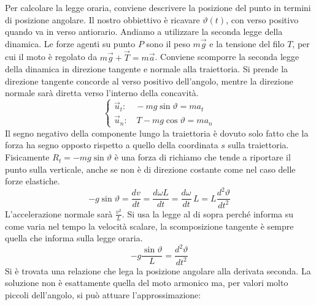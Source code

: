 \documentclass[10pt,a4paper]{book}
\begin{document}
\begin{figure}[htpb]
\end{figure}

Per calcolare la legge oraria, conviene descrivere la posizione del punto in termini di posizione angolare. Il nostro obbiettivo è ricavare $\vartheta (t)$, con verso positivo quando va in verso antiorario. Andiamo a utilizzare la seconda legge della dinamica. Le forze agenti su punto $P$ sono il peso $m\vec{g}$ e la tensione del filo $T$, per cui il moto è regolato da $m\vec{g}+\vec{T}=m\vec{a}$. Conviene scomporre la seconda legge della dinamica in direzione tangente e normale alla traiettoria. Si prende la direzione tangente concorde al verso positivo dell'angolo, mentre la direzione normale sarà diretta verso l'interno della concavità.
\[
	\begin{cases} \vec{u}_t: \quad -mg\sin\vartheta=ma_t \\ \vec{u}_n: \quad T-mg\cos\vartheta=ma_n \end{cases}
\]
Il segno negativo della componente lungo la traiettoria è dovuto solo fatto che la forza ha segno opposto rispetto a quello della coordinata $s$ sulla traiettoria. Fisicamente $R_t=-mg\sin\vartheta$ è una forza di richiamo che tende a riportare il punto sulla verticale, anche se non è di direzione costante come nel caso delle forze elastiche.
\[
	-g\sin\vartheta=\frac{dv}{dt}=\frac{d\omega L}{dt}=\frac{d\omega}{dt}\,L=L\frac{d^2\vartheta}{dt^2}
\]
L'accelerazione normale sarà $\frac{v^2}{L}$. Si usa la legge al di sopra perché informa su come varia nel tempo la velocità scalare, la scomposizione tangente è sempre quella che informa sulla legge oraria.
\[
	-g\frac{\sin\vartheta}{L}=\frac{d^2\vartheta}{dt^2}
\]
Si è trovata una relazione che lega la posizione angolare alla derivata seconda. La soluzione non è esattamente quella del moto armonico ma, per valori molto piccoli dell'angolo, si può attuare l'approssimazione:
\end{document}
